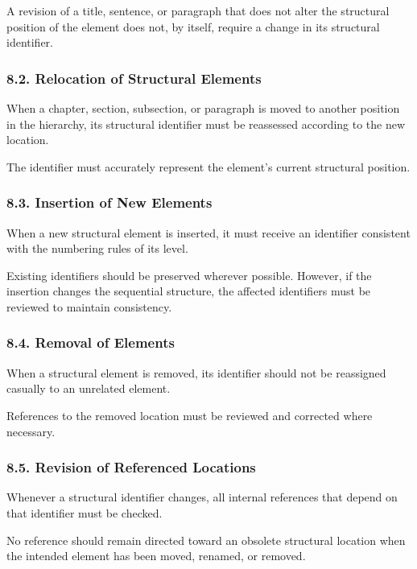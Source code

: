 A revision of a title, sentence,
or paragraph that does not alter
the structural position of the
element does not, by itself,
require a change in its structural
identifier.

\subsubsection*{8.2. Relocation of Structural Elements}

When a chapter, section, subsection,
or paragraph is moved to another
position in the hierarchy, its
structural identifier must be
reassessed according to the new
location.

The identifier must accurately
represent the element's current
structural position.

\subsubsection*{8.3. Insertion of New Elements}

When a new structural element is
inserted, it must receive an
identifier consistent with the
numbering rules of its level.

Existing identifiers should be
preserved wherever possible.
However, if the insertion changes
the sequential structure, the
affected identifiers must be
reviewed to maintain consistency.

\subsubsection*{8.4. Removal of Elements}

When a structural element is
removed, its identifier should
not be reassigned casually to
an unrelated element.

References to the removed location
must be reviewed and corrected
where necessary.

\subsubsection*{8.5. Revision of Referenced Locations}

Whenever a structural identifier
changes, all internal references
that depend on that identifier
must be checked.

No reference should remain directed
toward an obsolete structural
location when the intended element
has been moved, renamed, or removed.


